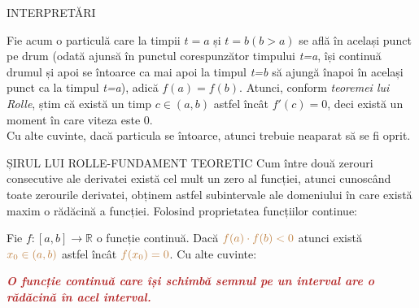 \documentclass[10pt]{article}
\begin{document}
\begin{multicols*}{3}
\begin{conceptbox}[brown]{INTERPRETĂRI}
		
		\quad Fie acum o particulă care la timpii $t = a$ și $t = b (b > a)$ se află în același punct pe drum (odată ajunsă în punctul corespunzător timpului \textit{t=a}, își continuă drumul și apoi se întoarce ca mai apoi la timpul \textit{t=b} să ajungă înapoi în același punct ca la timpul \textit{t=a}), adică $f(a) = f(b).$ Atunci, conform \textit{teoremei lui Rolle}, știm că există un timp $c \in \left(a, b\right)$ astfel încât $f'(c) = 0$, deci există un moment în care viteza este 0.\\
		
		\quad Cu alte cuvinte, dacă particula se întoarce, atunci trebuie neaparat să se fi oprit.
	\end{conceptbox}
	\begin{conceptbox}[firebrick]{ȘIRUL LUI ROLLE-FUNDAMENT TEORETIC}
	\quad	Cum între două zerouri consecutive ale derivatei există cel mult un zero al funcției, atunci cunoscând toate zerourile derivatei, obținem astfel subintervale ale domeniului în care există maxim o rădăcină a funcției. Folosind proprietatea funcțiilor continue:
		
		\begin{tcolorbox}[arc=0mm,
			interior engine=path,
			interior style={top color=blue!40!black, bottom color=blue!40!black!20!white},
			colframe=b,
			fontupper=\color{w},
			title={Proprietate},
			attach boxed title to top center={yshift=-3mm},
			colbacktitle=brown, enhanced,
			boxed title style={boxrule=0.75mm}
		]
			\quad Fie $f:\left[a, b\right]\to\mathbb{R}$ o funcție continuă. Dacă $\color{brown} f(a)\cdot f(b) < 0$ atunci există $\color{brown} x_0\in \left(a, b\right)$ astfel încât $\color{brown} f(x_0) = 0$. Cu alte cuvinte:
				\begin{quotebox}[myg]
				\quad	\textit{\textbf{\textcolor{firebrick}{O funcție continuă care își schimbă semnul pe un interval are o rădăcină în acel interval.}}}
				\end{quotebox}
			

\end{tcolorbox}
\end{conceptbox}
\end{multicols*}
\end{document}
